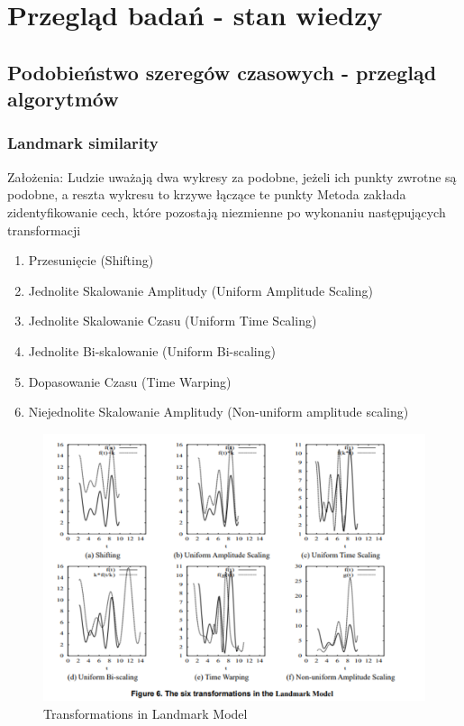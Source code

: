 
\chapter{Przegląd badań - stan wiedzy}

\section{Podobieństwo szeregów czasowych - przegląd algorytmów}
\subsection{Landmark similarity}
Założenia: Ludzie uważają dwa wykresy za podobne, jeżeli ich punkty zwrotne są podobne, a reszta wykresu to krzywe łączące te punkty
\newline
Metoda zakłada zidentyfikowanie cech, które pozostają niezmienne po wykonaniu następujących transformacji
\begin{enumerate}
    \item Przesunięcie (Shifting) 
    \item Jednolite Skalowanie Amplitudy (Uniform Amplitude Scaling)
    \item Jednolite Skalowanie Czasu (Uniform Time Scaling)
    \item Jednolite Bi-skalowanie (Uniform Bi-scaling)
    \item Dopasowanie Czasu (Time Warping)
    \item Niejednolite Skalowanie Amplitudy (Non-uniform amplitude scaling)
\end{enumerate}
\begin{figure}[H]
    \centering
    \captionsetup{justification=centering,margin=0.5cm}
    \includegraphics[scale=0.4]{figures/03-teoria/theSixTransformationsInTheLandmarkModel.png}
    \caption{Transformations in Landmark Model}
    \label{fig:scr46}
\end{figure}
